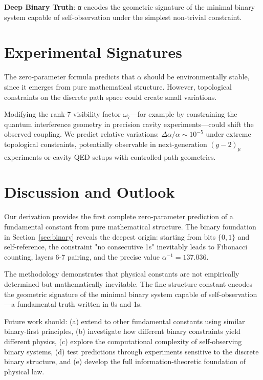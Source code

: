 \documentclass[%
 reprint,
 amsmath,amssymb,
 aps,
 prd,
 10pt,
 nofootinbib,      %
 longbibliography  %
]{revtex4-2}
\theoremstyle{definition}
\theoremstyle{remark}
\begin{document}
\textbf{Deep Binary Truth}: α encodes the geometric signature of the minimal binary system capable of self-observation under the simplest non-trivial constraint.

\section{Experimental Signatures}\label{sec:exp}

The zero-parameter formula predicts that $\alpha$ should be environmentally stable,
since it emerges from pure mathematical structure. However, topological constraints
on the discrete path space could create small variations.

Modifying the rank-7 visibility factor $\omega_7$---for example by constraining
the quantum interference geometry in precision cavity experiments---could shift
the observed coupling. We predict relative variations:
\(\Delta\alpha/\alpha \sim 10^{-5}\)
under extreme topological constraints, potentially observable in next-generation
$(g-2)_\mu$ experiments or cavity QED setups with controlled path geometries.

\section{Discussion and Outlook}\label{sec:discussion}

Our derivation provides the first complete zero-parameter prediction
of a fundamental constant from pure mathematical structure.
The binary foundation in Section~\ref{sec:binary} reveals the deepest
origin: starting from bits $\{0,1\}$ and self-reference, the constraint
"no consecutive 1s" inevitably leads to Fibonacci counting, layers 6-7
pairing, and the precise value $\alpha^{-1} = 137.036$.

The methodology demonstrates that physical constants are not empirically
determined but mathematically inevitable. The fine structure constant
encodes the geometric signature of the minimal binary system capable
of self-observation—a fundamental truth written in 0s and 1s.

Future work should:
(a) extend to other fundamental constants using similar binary-first principles,
(b) investigate how different binary constraints yield different physics,
(c) explore the computational complexity of self-observing binary systems,
(d) test predictions through experiments sensitive to the discrete binary structure,
and (e) develop the full information-theoretic foundation of physical law.
\end{document}
